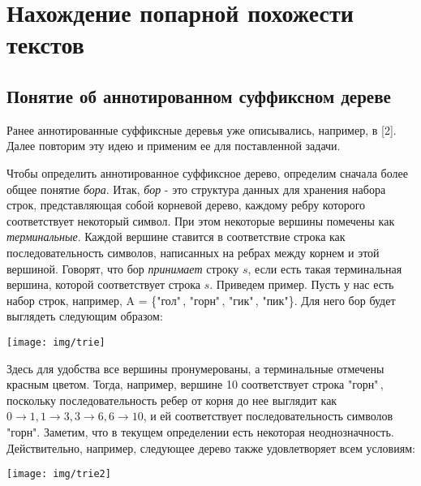 \section{Нахождение попарной похожести текстов}

\subsection{Понятие об аннотированном суффиксном дереве}
Ранее аннотированные суффиксные деревья уже описывались, например, в [2]. Далее повторим эту идею и применим ее для поставленной задачи.

Чтобы определить аннотированное суффиксное дерево, определим сначала более общее понятие \emph{бора}. Итак, \emph{бор} - это структура данных для хранения набора строк, представляющая собой корневой дерево, каждому ребру которого соответствует некоторый символ. При этом некоторые вершины помечены как \emph{терминальные}. Каждой вершине ставится в соответствие строка как последовательность символов, написанных на ребрах между корнем и этой вершиной. Говорят, что бор \emph{принимает} строку $s$, если есть такая терминальная вершина, которой соответствует строка $s$.\newline
Приведем пример. Пусть у нас есть набор строк, например, A = \{"гол"\,, "горн"\,, "гик"\,, "пик"\}. Для него бор будет выглядеть следующим образом:
\begin{center} 
	\texttt{[image: img/trie]}
\end{center}
Здесь для удобства все вершины пронумерованы, а терминальные отмечены красным цветом.\newline
Тогда, например, вершине 10 соответствует строка "горн"\,, поскольку последовательность ребер от корня до нее выглядит как $0 \rightarrow 1, 1 \rightarrow 3, 3 \rightarrow 6, 6 \rightarrow 10$, и ей соответствует последовательность символов "горн". \newline
Заметим, что в текущем определении есть некоторая неоднозначность. Действительно, например, следующее дерево также удовлетворяет всем условиям:
\begin{center} 
	\texttt{[image: img/trie2]}
\end{center}
